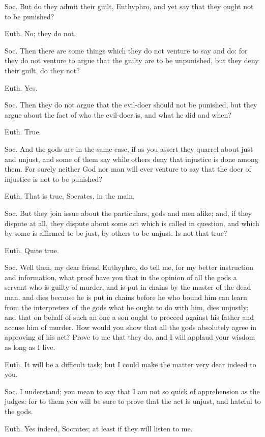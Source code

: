 Soc. But do they admit their guilt, Euthyphro, and yet say that they ought not to be punished?

Euth. No; they do not.

Soc. Then there are some things which they do not venture to say and do: for they do not venture to argue that the guilty are to be unpunished, but they deny their guilt, do they not?

Euth. Yes.

Soc. Then they do not argue that the evil-doer should not be punished, but they argue about the fact of who the evil-doer is, and what he did and when?

Euth. True.

Soc. And the gods are in the same case, if as you assert they quarrel about just and unjust, and some of them say while others deny that injustice is done among them. For surely neither God nor man will ever venture to say that the doer of injustice is not to be punished?

Euth. That is true, Socrates, in the main.

Soc. But they join issue about the particulars, gods and men alike; and, if they dispute at all, they dispute about some act which is called in question, and which by some is affirmed to be just, by others to be unjust. Is not that true?

Euth. Quite true.

Soc. Well then, my dear friend Euthyphro, do tell me, for my better instruction and information, what proof have you that in the opinion of all the gods a servant who is guilty of murder, and is put in chains by the master of the dead man, and dies because he is put in chains before he who bound him can learn from the interpreters of the gods what he ought to do with him, dies unjustly; and that on behalf of such an one a son ought to proceed against his father and accuse him of murder. How would you show that all the gods absolutely agree in approving of his act? Prove to me that they do, and I will applaud your wisdom as long as I live.

Euth. It will be a difficult task; but I could make the matter very dear indeed to you.

Soc. I understand; you mean to say that I am not so quick of apprehension as the judges: for to them you will be sure to prove that the act is unjust, and hateful to the gods.

Euth. Yes indeed, Socrates; at least if they will listen to me.

